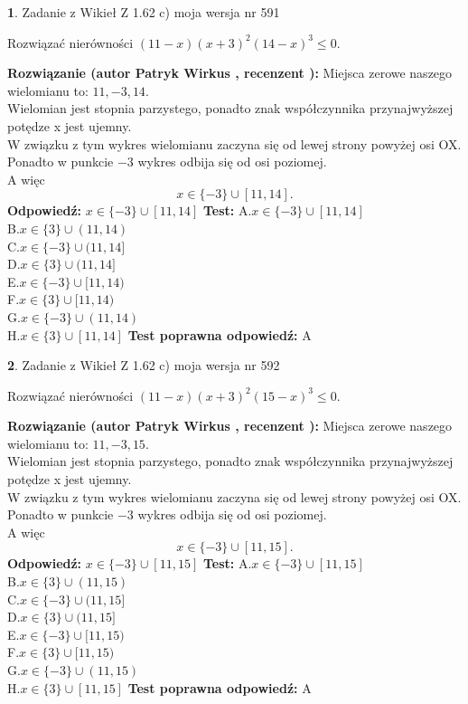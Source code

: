 \documentclass[12pt, a4paper]{article}
\theoremstyle{definition} %
\newtheorem{zad}{}
\newcommand{\zadStart}[1]{\begin{zad}#1\newline}
\newcommand{\zadStop}{\end{zad}}
\newcommand{\rozwStart}[2]{\noindent \textbf{Rozwiązanie (autor #1 , recenzent #2): }\newline}
\newcommand{\rozwStop}{\newline}
\newcommand{\odpStart}{\noindent \textbf{Odpowiedź:}\newline}
\newcommand{\odpStop}{\newline}
\newcommand{\testStart}{\noindent \textbf{Test:}\newline}
\newcommand{\testStop}{\newline}
\newcommand{\kluczStart}{\noindent \textbf{Test poprawna odpowiedź:}\newline}
\newcommand{\kluczStop}{\newline}
\begin{document}
\zadStart{Zadanie z Wikieł Z 1.62 c) moja wersja nr 591}

Rozwiązać nierówności $(11-x)(x+3)^{2}(14-x)^{3}\le0$.
\zadStop
\rozwStart{Patryk Wirkus}{}
Miejsca zerowe naszego wielomianu to: $11, -3, 14$.\\
Wielomian jest stopnia parzystego, ponadto znak współczynnika przy\linebreak najwyższej potędze x jest ujemny.\\ W związku z tym wykres wielomianu zaczyna się od lewej strony powyżej osi OX.\\
Ponadto w punkcie $-3$ wykres odbija się od osi poziomej.\\
A więc $$x \in \{-3\} \cup [11,14].$$
\rozwStop
\odpStart
$x \in \{-3\} \cup [11,14]$
\odpStop
\testStart
A.$x \in \{-3\} \cup [11,14]$\\
B.$x \in \{3\} \cup (11,14)$\\
C.$x \in \{-3\} \cup (11,14]$\\
D.$x \in \{3\} \cup (11,14]$\\
E.$x \in \{-3\} \cup [11,14)$\\
F.$x \in \{3\} \cup [11,14)$\\
G.$x \in \{-3\} \cup (11,14)$\\
H.$x \in \{3\} \cup [11,14]$
\testStop
\kluczStart
A
\kluczStop



\zadStart{Zadanie z Wikieł Z 1.62 c) moja wersja nr 592}

Rozwiązać nierówności $(11-x)(x+3)^{2}(15-x)^{3}\le0$.
\zadStop
\rozwStart{Patryk Wirkus}{}
Miejsca zerowe naszego wielomianu to: $11, -3, 15$.\\
Wielomian jest stopnia parzystego, ponadto znak współczynnika przy\linebreak najwyższej potędze x jest ujemny.\\ W związku z tym wykres wielomianu zaczyna się od lewej strony powyżej osi OX.\\
Ponadto w punkcie $-3$ wykres odbija się od osi poziomej.\\
A więc $$x \in \{-3\} \cup [11,15].$$
\rozwStop
\odpStart
$x \in \{-3\} \cup [11,15]$
\odpStop
\testStart
A.$x \in \{-3\} \cup [11,15]$\\
B.$x \in \{3\} \cup (11,15)$\\
C.$x \in \{-3\} \cup (11,15]$\\
D.$x \in \{3\} \cup (11,15]$\\
E.$x \in \{-3\} \cup [11,15)$\\
F.$x \in \{3\} \cup [11,15)$\\
G.$x \in \{-3\} \cup (11,15)$\\
H.$x \in \{3\} \cup [11,15]$
\testStop
\kluczStart
A
\kluczStop
\end{document}
